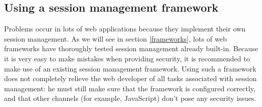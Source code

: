 \subsection{Using a session management framework}\label{use-framework}

Problems occur in lots of web applications because they implement their own session management. As we will see in section \ref{frameworks}, lots of web frameworks have thoroughly tested session management already built-in. Because it is very easy to make mistakes when providing security, it is recommended to make use of an existing session management framework. Using such a framework does not completely relieve the web developer of all tasks associated with session management: he must still make sure that the framework is configured correctly, and that other channels (for example, JavaScript) don't pose any security issues.
